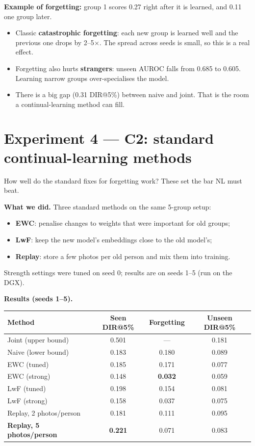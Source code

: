 \documentclass[11pt,a4paper]{article}
\begin{document}
\textbf{Example of forgetting:} group 1 scores 0.27 right after it is learned, and 0.11 one group later.

\begin{means}
\begin{itemize}[leftmargin=1.2em]
  \item Classic \textbf{catastrophic forgetting}: each new group is learned well and the previous one drops by 2--5$\times$. The spread across seeds is small, so this is a real effect.
  \item Forgetting also hurts \textbf{strangers}: unseen AUROC falls from 0.685 to 0.605. Learning narrow groups over-specialises the model.
  \item There is a big gap (0.31 DIR@5\%) between naive and joint. That is the room a continual-learning method can fill.
\end{itemize}
\end{means}

\section{Experiment 4 --- C2: standard continual-learning methods}

\begin{question}
How well do the standard fixes for forgetting work? These set the bar NL must beat.
\end{question}

\textbf{What we did.} Three standard methods on the same 5-group setup:
\begin{itemize}
  \item \textbf{EWC}: penalise changes to weights that were important for old groups;
  \item \textbf{LwF}: keep the new model's embeddings close to the old model's;
  \item \textbf{Replay}: store a few photos per old person and mix them into training.
\end{itemize}
Strength settings were tuned on seed 0; results are on seeds 1--5 (run on the DGX).

\textbf{Results (seeds 1--5).}
\begin{center}
\begin{tabular}{@{}lccc@{}}
\toprule
\textbf{Method} & \textbf{Seen DIR@5\%} & \textbf{Forgetting} & \textbf{Unseen DIR@5\%}\\
\midrule
Joint (upper bound) & 0.501 & --- & 0.181\\
Naive (lower bound) & 0.183 & 0.180 & 0.089\\
EWC (tuned) & 0.185 & 0.171 & 0.077\\
EWC (strong) & 0.148 & \textbf{0.032} & 0.059\\
LwF (tuned) & 0.198 & 0.154 & 0.081\\
LwF (strong) & 0.158 & 0.037 & 0.075\\
Replay, 2 photos/person & 0.181 & 0.111 & 0.095\\
\textbf{Replay, 5 photos/person} & \textbf{0.221} & 0.071 & 0.083\\
\bottomrule
\end{tabular}
\end{center}
\end{document}
